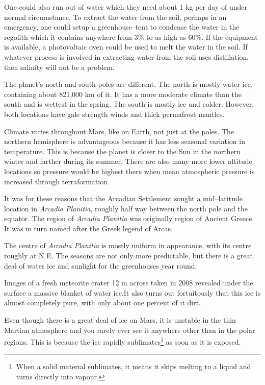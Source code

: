 One could also run out of water which they need about 1 kg per day of under normal circumstance. To extract the water from the soil, perhaps in an emergency, one could setup a greenhouse--tent to condense the water in the regolith which it contains anywhere from 3\% to as high as 60\%. If the equipment is available, a photovoltaic oven could be used to melt the water in the soil. If whatever process is involved in extracting water from the soil uses distillation, then salinity will not be a problem.


The planet's north and south poles are different. The north is mostly water ice, containing about 821,000 km of it. It has a more moderate climate than the south and is wettest in the spring. The south is mostly  ice and colder. However, both locations have gale strength winds and thick permafrost mantles.

Climate varies throughout Mars, like on Earth, not just at the poles. The northern hemisphere is advantageous because it has less seasonal variation in temperature. This is because the planet is closer to the Sun in the northern winter and farther during its summer. There are also many more lower altitude locations so pressure would be highest there when mean atmospheric pressure is increased through terraformation.

It was for these reasons that the Arcadian Settlement sought a mid--latitude location in {\it Arcadia Planitia}, roughly half way between the north pole and the equator. The region of {\it Arcadia Planitia} was originally region of Ancient Greece. It was in turn named after the Greek legend of Arcas.

The centre of {\it Arcadia Planitia} is mostly uniform in appearance, with its centre roughly at N E. The seasons are not only more predictable, but there is a great deal of water ice and sunlight for the greenhouses year round.

Images of a fresh meteorite crater 12 m across taken in 2008 revealed under the surface a massive blanket of water ice. It also turns out fortuitously that this ice is almost completely pure, with only about one percent of it dirt.

Even though there is a great deal of ice on Mars, it is unstable in the thin Martian atmosphere and you rarely ever see it anywhere other than in the polar regions. This is because the ice rapidly sublimates\footnote{When a solid material sublimates, it means it skips melting to a liquid and turns directly into vapour.} as soon as it is exposed.

